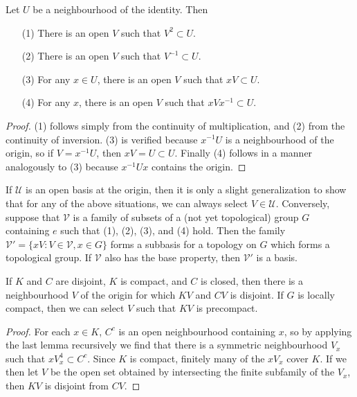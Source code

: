 \begin{lemma}
    Let $U$ be a neighbourhood of the identity. Then
    \begin{itemize}
        \item[(1)] There is an open $V$ such that $V^2 \subset U$.
        \item[(2)] There is an open $V$ such that $V^{-1} \subset U$.
        \item[(3)] For any $x \in U$, there is an open $V$ such that $xV \subset U$.
        \item[(4)] For any $x$, there is an open $V$ such that $xVx^{-1} \subset U$.
    \end{itemize}
\end{lemma}
\begin{proof}
    (1) follows simply from the continuity of multiplication, and (2) from the continuity of inversion. (3) is verified because $x^{-1}U$ is a neighbourhood of the origin, so if $V = x^{-1}U$, then $xV = U \subset U$. Finally (4) follows in a manner analogously to (3) because $x^{-1}Ux$ contains the origin.
\end{proof}

If $\mathcal{U}$ is an open basis at the origin, then it is only a slight generalization to show that for any of the above situations, we can always select $V \in \mathcal{U}$. Conversely, suppose that $\mathcal{V}$ is a family of subsets of a (not yet topological) group $G$ containing $e$ such that (1), (2), (3), and (4) hold. Then the family $\mathcal{V}' = \{ xV : V \in \mathcal{V}, x \in G \}$ forms a subbasis for a topology on $G$ which forms a topological group. If $\mathcal{V}$ also has the base property, then $\mathcal{V}'$ is a basis.

\begin{theorem}
    If $K$ and $C$ are disjoint, $K$ is compact, and $C$ is closed, then there is a neighbourhood $V$ of the origin for which $KV$ and $CV$ is disjoint. If $G$ is locally compact, then we can select $V$ such that $KV$ is precompact.
\end{theorem}
\begin{proof}
    For each $x \in K$, $C^c$ is an open neighbourhood containing $x$, so by applying the last lemma recursively we find that there is a symmetric neighbourhood $V_x$ such that $x V_x^4 \subset C^c$. Since $K$ is compact, finitely many of the $xV_x$ cover $K$. If we then let $V$ be the open set obtained by intersecting the finite subfamily of the $V_x$, then $KV$ is disjoint from $CV$.
\end{proof}

